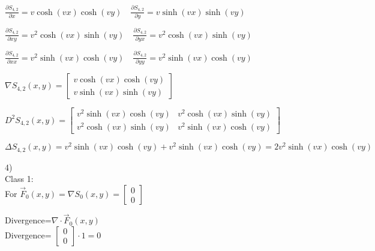 \documentclass[12pt, executivepaper]{article}
\begin{document}
\begin{flushleft}
$\frac{\partial S_{4,2}}{\partial x}=v\cosh(vx)\cosh(vy) \quad \frac{\partial S_{4,2}}{\partial y}=v\sinh(vx)\sinh(vy)$ \\

\vspace{3mm}

$\frac{\partial S_{4,2}}{\partial xy}=v^2\cosh(vx)\sinh(vy) \quad \frac{\partial S_{4,2}}{\partial yx}=v^2\cosh(vx)\sinh(vy)$ \\

\vspace{3mm}

$\frac{\partial S_{4,2}}{\partial xx}=v^2\sinh(vx)\cosh(vy) \quad \frac{\partial S_{4,2}}{\partial yy}=v^2\sinh(vx)\cosh(vy)$ \\

\vspace{3mm}

$\nabla S_{4,2}(x,y)=
\begin{bmatrix}
v\cosh(vx)\cosh(vy) \\
v\sinh(vx)\sinh(vy)
\end{bmatrix}$

\vspace{3mm}

$D^2 S_{4,2}(x,y)=
\begin{bmatrix}
v^2\sinh(vx)\cosh(vy) & v^2\cosh(vx)\sinh(vy) \\
v^2\cosh(vx)\sinh(vy) & v^2\sinh(vx)\cosh(vy)
\end{bmatrix}$

\vspace{3mm}

$\Delta S_{4,2}(x,y)=v^2\sinh(vx)\cosh(vy)+v^2\sinh(vx)\cosh(vy)=2v^2\sinh(vx)\cosh(vy)$

\vspace{5mm}

4) \\

Class 1: \\
For $\vec F_{0}(x,y)=\nabla S_{0}(x,y)=
\begin{bmatrix}
0 \\
0
\end{bmatrix}$

\vspace{3mm}

Divergence=$\nabla \cdot \vec F_{0}(x,y)$ \\
Divergence=
$\begin{bmatrix}
0 \\
0
\end{bmatrix} \cdot 1=0$


\end{flushleft}
\end{document}
